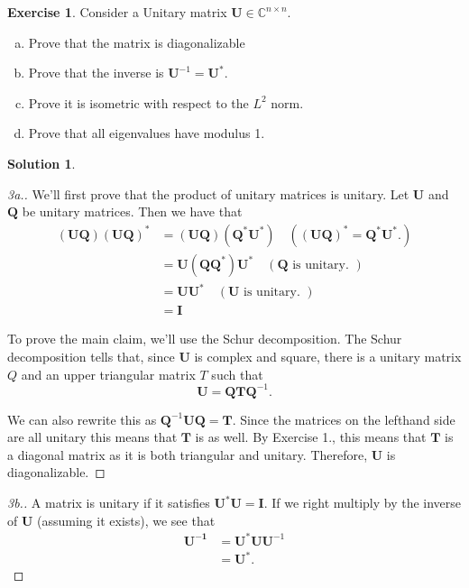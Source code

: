 \documentclass[12pt]{article}
\newcommand{\bbC}{\mathbb{C}}
\renewcommand{\vec}[1]{\mathbf{#1}}
\theoremstyle{definition}
\newtheorem{exer}{Exercise}
\newtheorem{sol}{Solution}
\theoremstyle{remark}
\begin{document}
\newpage
\begin{exer}
    Consider a Unitary matrix $\vec{U} \in \bbC^{n \times n}$.
    \begin{enumerate}[a.]
        \item Prove that the matrix is diagonalizable
    \item Prove that the inverse is $\vec{U}^{-1} = \vec{U}^*$.
    \item Prove it is isometric with respect to the $L^2$ norm.
    \item Prove that all eigenvalues have modulus 1.
\end{enumerate}
\end{exer}

\begin{sol}\leavevmode
\begin{proof}[3a.]
   We'll first prove that the product of unitary matrices is unitary. Let $\vec{U}$ and $\vec{Q}$ be unitary matrices. Then we have that
    \begin{align}
        (\vec{U}\vec{Q})(\vec{U}\vec{Q})^* &= (\vec{U}\vec{Q})(\vec{Q}^*\vec{U}^*) \quad ((\vec{UQ})^* = \vec{Q}^*\vec{U}^*.) \\
                                           &= \vec{U}(\vec{Q}\vec{Q}^*)\vec{U}^* \quad (\vec{Q} \text{ is unitary. })\\
                                           &= \vec{U}\vec{U}^*  \quad (\vec{U} \text{ is unitary. }) \\
                                           &= \vec{I}
    \end{align}

    To prove the main claim, we'll use the Schur decomposition. The Schur decomposition tells that, since $\vec{U}$ is complex and square, there is a unitary matrix $Q$ and an upper triangular matrix $T$ such that
    \begin{equation}
        \vec{U} = \vec{Q}\vec{T}\vec{Q}^{-1}.
    \end{equation}

    We can also rewrite this as $\vec{Q}^{-1}\vec{U}\vec{Q} = \vec{T}$. Since the matrices on the lefthand side are all unitary this means that $\vec{T}$ is as well. By Exercise 1., this means that $\vec{T}$ is a diagonal matrix as it is both triangular and unitary. Therefore, $\vec{U}$ is diagonalizable.
\end{proof}

\begin{proof}[3b.]
    A matrix is unitary if it satisfies $\vec{U}^*\vec{U} = \vec{I}$. If we right multiply by the inverse of $\vec{U}$ (assuming it exists), we see that
\begin{align}
    \vec{U^{-1}} &= \vec{U}^*\vec{U}\vec{U}^{-1}  \\
                 &= \vec{U}^*.
\end{align}
\end{proof}


\end{sol}
\end{document}
